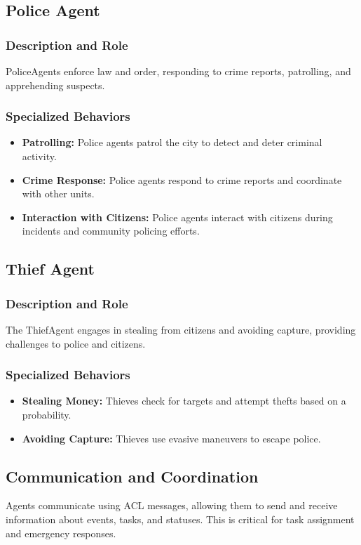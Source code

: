 \documentclass[conference]{IEEEtran}
\begin{document}
  \subsection{Police Agent}
  \subsubsection{Description and Role}
  PoliceAgents enforce law and order, responding to crime reports, patrolling, and apprehending suspects.
  
  \subsubsection{Specialized Behaviors}
  \begin{itemize}
  \item \textbf{Patrolling:} Police agents patrol the city to detect and deter criminal activity.
  \item \textbf{Crime Response:} Police agents respond to crime reports and coordinate with other units.
  \item \textbf{Interaction with Citizens:} Police agents interact with citizens during incidents and community policing efforts.
  \end{itemize}
  
  \subsection{Thief Agent}
  \subsubsection{Description and Role}
  The ThiefAgent engages in stealing from citizens and avoiding capture, providing challenges to police and citizens.
  
  \subsubsection{Specialized Behaviors}
  \begin{itemize}
  \item \textbf{Stealing Money:} Thieves check for targets and attempt thefts based on a probability.
  \item \textbf{Avoiding Capture:} Thieves use evasive maneuvers to escape police.
  \end{itemize}
  
  \subsection{Communication and Coordination}
  Agents communicate using ACL messages, allowing them to send and receive information about events, tasks, and statuses. This is critical for task assignment and emergency responses.
  
\end{document}
